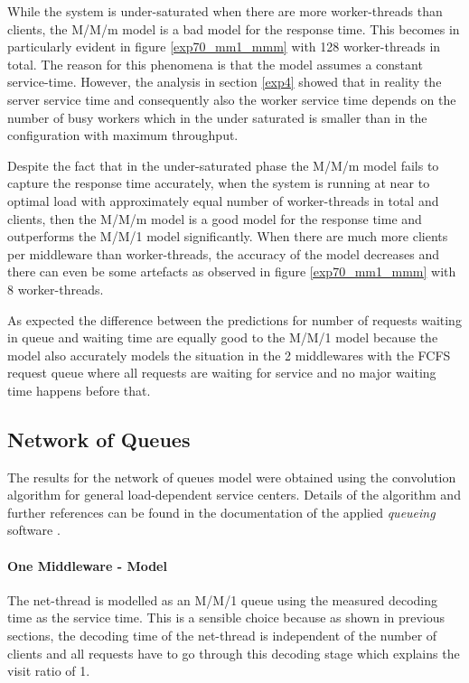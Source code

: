 \documentclass[report.tex]{subfiles}
\begin{document}
While the system is under-saturated when there are more worker-threads than clients, the M/M/m model is a bad model for the response time. This becomes in particularly evident in figure \ref{exp70_mm1_mmm} with 128 worker-threads in total. The reason for this phenomena is that the model assumes a constant service-time. However, the analysis in section \ref{exp4} showed that in reality the server service time and consequently also the worker service time depends on the number of busy workers which in the under saturated is smaller than in the configuration with maximum throughput.

Despite the fact that in the under-saturated phase the M/M/m model fails to capture the response time accurately, when the system is running at near to optimal load with approximately equal number of worker-threads in total and clients, then the M/M/m model is a good model for the response time and outperforms the M/M/1 model significantly.
When there are much more clients per middleware than worker-threads, the accuracy of the model decreases and there can even be some artefacts as observed in figure \ref{exp70_mm1_mmm} with 8 worker-threads.

As expected the difference between the predictions for number of requests waiting in queue and waiting time are equally good to the M/M/1 model because the model also accurately models the situation in the 2 middlewares with the FCFS request queue where all requests are waiting for service and no major waiting time happens before that.

\subsection{Network of Queues}

The results for the network of queues model were obtained using the convolution algorithm for general load-dependent service centers. Details of the algorithm and further references can be found in the documentation of the applied \emph{queueing} software \cite{queueing}.


\paragraph{One Middleware - Model}

The net-thread is modelled as an M/M/1 queue using the measured decoding time as the service time.
This is a sensible choice because as shown in previous sections, the decoding time of the net-thread is independent of the number of clients and all requests have to go through this decoding stage which explains the visit ratio of 1.
\end{document}
